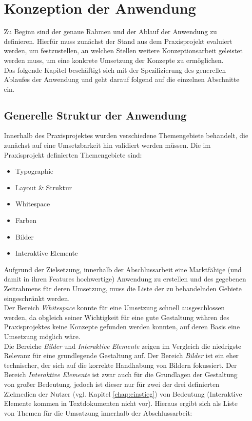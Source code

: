 \chapter{Konzeption der Anwendung}
\thispagestyle{fancy}
\label{chap:concept}

Zu Beginn sind der genaue Rahmen und der Ablauf der Anwendung zu definieren. Hierfür muss zunächst der Stand aus dem Praxisprojekt evaluiert werden, um festzustellen, an welchen Stellen weitere Konzeptionsarbeit geleistet werden muss, um eine konkrete Umsetzung der Konzepte zu ermöglichen.\\
Das folgende Kapitel beschäftigt sich mit der Spezifizierung des generellen Ablaufes der Anwendung und geht darauf folgend auf die einzelnen Abschnitte ein.

\section{Generelle Struktur der Anwendung}
\label{chap:pp}

Innerhalb des Praxisprojektes wurden verschiedene Themengebiete behandelt, die zunächst auf eine Umsetzbarkeit hin validiert werden müssen. Die im Praxisprojekt definierten Themengebiete \cite{PoplawskiPP} sind:

\begin{itemize}
  \item Typographie
  \item Layout \& Struktur
  \item Whitespace
  \item Farben
  \item Bilder
  \item Interaktive Elemente
\end{itemize}

Aufgrund der Zielsetzung, innerhalb der Abschlussarbeit eine Marktfähige (und damit in ihren Features hochwertige) Anwendung zu erstellen und des gegebenen Zeitrahmens für deren Umsetzung, muss die Liste der zu behandelnden Gebiete eingeschränkt werden.\\
Der Bereich \textit{Whitespace} konnte für eine Umsetzung schnell ausgeschlossen werden, da obgleich seiner Wichtigkeit für eine gute Gestaltung währen des Praxisprojektes keine Konzepte gefunden werden konnten, auf deren Basis eine Umsetzung möglich wäre.\\
Die Bereiche \textit{Bilder} und \textit{Interaktive Elemente} zeigen im Vergleich die niedrigste Relevanz für eine grundlegende Gestaltung auf. Der Bereich \textit{Bilder} ist ein eher technischer, der sich auf die korrekte Handhabung von Bildern fokussiert. Der Bereich \textit{Interaktive Elemente} ist zwar auch für die Grundlagen der Gestaltung von großer Bedeutung, jedoch ist dieser nur für zwei der drei definierten Zielmedien der Nutzer (vgl. Kapitel \ref{chap:einstieg}) von Bedeutung (Interaktive Elemente kommen in Textdokumenten nicht vor). Hieraus ergibt sich als Liste von Themen für die Umsatzung innerhalb der Abschlussarbeit:

